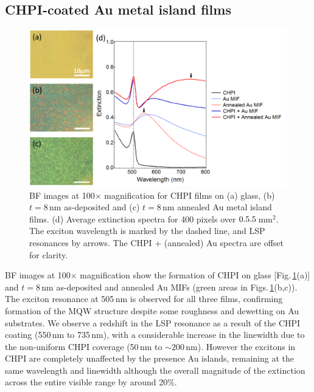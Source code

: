 \subsection{CHPI-coated Au metal island films}
\begin{figure}[h!] 
\centering    
\includegraphics[width=\textwidth]{Fig3}
\caption{BF images at 100$\times$ magnification for CHPI films on (a) glass, (b) $t=8$\,nm as-deposited and (c) $t=8$\,nm annealed Au metal island films. (d) Average extinction spectra for 400 pixels over $0.5\time0.5$\,mm$^2$. The exciton wavelength is marked by the dashed line, and LSP resonances by arrows. The CHPI + (annealed) Au spectra are offset for clarity.}
\label{6Fig3}
\end{figure}
BF images at 100$\times$ magnification show the formation of CHPI on glass [Fig.\,\ref{6Fig3}(a)] and $t=8$\,nm as-deposited and annealed Au MIFs (green areas in Figs.\,\ref{6Fig3}(b,c)). The exciton resonance at 505\,nm is observed for all three films, confirming formation of the MQW structure despite some roughness and dewetting on Au substrates. We observe a redshift in the LSP resonance as a result of the CHPI coating (550\,nm to 735\,nm), with a considerable increase in the linewidth due to the non-uniform CHPI coverage (50\,nm to $\sim200$\,nm). However the excitons in CHPI are completely unaffected by the presence Au islands, remaining at the same wavelength and linewidth although the overall magnitude of the extinction across the entire visible range by around 20\%.

